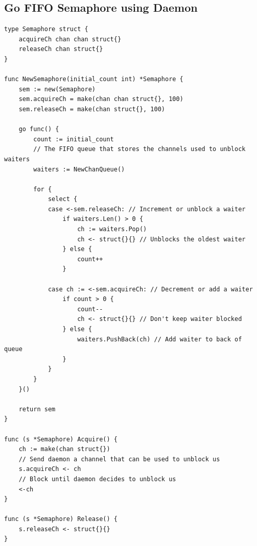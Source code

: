 \documentclass{article}
\begin{document}
\subsection{Go FIFO Semaphore using Daemon}
\begin{lstlisting}[language=Golang]
type Semaphore struct {
	acquireCh chan chan struct{}
	releaseCh chan struct{}
}

func NewSemaphore(initial_count int) *Semaphore {
	sem := new(Semaphore)
	sem.acquireCh = make(chan chan struct{}, 100)
	sem.releaseCh = make(chan struct{}, 100)

	go func() {
		count := initial_count
		// The FIFO queue that stores the channels used to unblock waiters
		waiters := NewChanQueue()

		for {
			select {
			case <-sem.releaseCh: // Increment or unblock a waiter
				if waiters.Len() > 0 {
					ch := waiters.Pop()
					ch <- struct{}{} // Unblocks the oldest waiter
				} else {
					count++
				}

			case ch := <-sem.acquireCh: // Decrement or add a waiter
				if count > 0 {
					count--
					ch <- struct{}{} // Don't keep waiter blocked
				} else {
					waiters.PushBack(ch) // Add waiter to back of queue
				}
			}
		}
	}()

	return sem
}

func (s *Semaphore) Acquire() {
	ch := make(chan struct{})
	// Send daemon a channel that can be used to unblock us
	s.acquireCh <- ch
	// Block until daemon decides to unblock us
	<-ch
}

func (s *Semaphore) Release() {
	s.releaseCh <- struct{}{}
}
\end{lstlisting}
\end{document}
